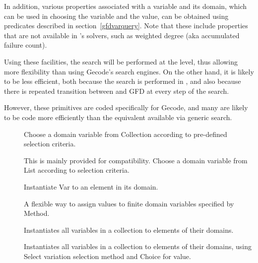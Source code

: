 In addition, various properties associated
with a variable and its domain, which can be used in choosing the variable
and the value, can be obtained using predicates described
in section~\ref{gfdvarquery}. Note that these include properties that are not
available in
 \eclipse's solvers, such as weighted degree (aka accumulated failure count).

Using these facilities, the search will be performed
at the \eclipse level, thus allowing more flexibility than using Gecode's 
search engines. On the other hand, it is likely to be less efficient, both
because the search is performed in \eclipse, and also because there is
repeated transition between \eclipse and GFD at every step of the search.

However, these primitives are coded specifically for Gecode, and many are
likely to be code more efficiently than the equivalent available via 
generic search. 

\begin{description}
\item[]
Choose a domain variable from Collection according to pre-defined selection criteria.

\item[]
This is mainly provided for compatibility. Choose a domain variable from List according to selection criteria.

\item[]
Instantiate Var to an element in its domain.

\item[]
A flexible way to assign values to finite domain variables specified
 by Method.

\item[]
Instantiates all variables in a collection to elements of their domains.

\item[]
Instantiates all variables in a collection to elements of their domains, using 
Select variation selection method and Choice for value.
\end{description}

